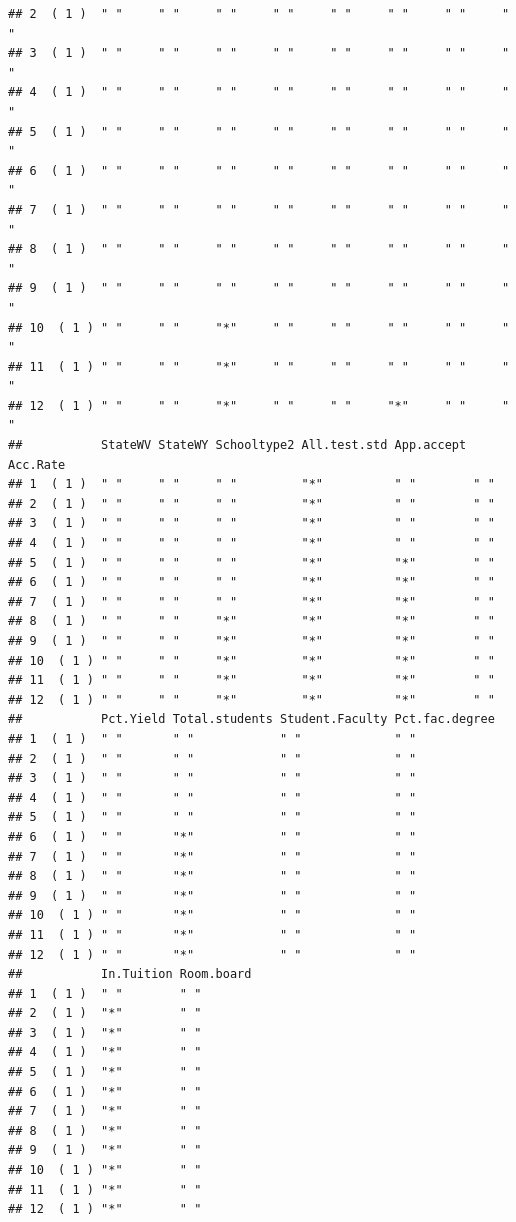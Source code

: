 \documentclass[]{article}
\begin{document}
\begin{verbatim}
## 2  ( 1 )  " "     " "     " "     " "     " "     " "     " "     " "    
## 3  ( 1 )  " "     " "     " "     " "     " "     " "     " "     " "    
## 4  ( 1 )  " "     " "     " "     " "     " "     " "     " "     " "    
## 5  ( 1 )  " "     " "     " "     " "     " "     " "     " "     " "    
## 6  ( 1 )  " "     " "     " "     " "     " "     " "     " "     " "    
## 7  ( 1 )  " "     " "     " "     " "     " "     " "     " "     " "    
## 8  ( 1 )  " "     " "     " "     " "     " "     " "     " "     " "    
## 9  ( 1 )  " "     " "     " "     " "     " "     " "     " "     " "    
## 10  ( 1 ) " "     " "     "*"     " "     " "     " "     " "     " "    
## 11  ( 1 ) " "     " "     "*"     " "     " "     " "     " "     " "    
## 12  ( 1 ) " "     " "     "*"     " "     " "     "*"     " "     " "    
##           StateWV StateWY Schooltype2 All.test.std App.accept Acc.Rate
## 1  ( 1 )  " "     " "     " "         "*"          " "        " "     
## 2  ( 1 )  " "     " "     " "         "*"          " "        " "     
## 3  ( 1 )  " "     " "     " "         "*"          " "        " "     
## 4  ( 1 )  " "     " "     " "         "*"          " "        " "     
## 5  ( 1 )  " "     " "     " "         "*"          "*"        " "     
## 6  ( 1 )  " "     " "     " "         "*"          "*"        " "     
## 7  ( 1 )  " "     " "     " "         "*"          "*"        " "     
## 8  ( 1 )  " "     " "     "*"         "*"          "*"        " "     
## 9  ( 1 )  " "     " "     "*"         "*"          "*"        " "     
## 10  ( 1 ) " "     " "     "*"         "*"          "*"        " "     
## 11  ( 1 ) " "     " "     "*"         "*"          "*"        " "     
## 12  ( 1 ) " "     " "     "*"         "*"          "*"        " "     
##           Pct.Yield Total.students Student.Faculty Pct.fac.degree
## 1  ( 1 )  " "       " "            " "             " "           
## 2  ( 1 )  " "       " "            " "             " "           
## 3  ( 1 )  " "       " "            " "             " "           
## 4  ( 1 )  " "       " "            " "             " "           
## 5  ( 1 )  " "       " "            " "             " "           
## 6  ( 1 )  " "       "*"            " "             " "           
## 7  ( 1 )  " "       "*"            " "             " "           
## 8  ( 1 )  " "       "*"            " "             " "           
## 9  ( 1 )  " "       "*"            " "             " "           
## 10  ( 1 ) " "       "*"            " "             " "           
## 11  ( 1 ) " "       "*"            " "             " "           
## 12  ( 1 ) " "       "*"            " "             " "           
##           In.Tuition Room.board
## 1  ( 1 )  " "        " "       
## 2  ( 1 )  "*"        " "       
## 3  ( 1 )  "*"        " "       
## 4  ( 1 )  "*"        " "       
## 5  ( 1 )  "*"        " "       
## 6  ( 1 )  "*"        " "       
## 7  ( 1 )  "*"        " "       
## 8  ( 1 )  "*"        " "       
## 9  ( 1 )  "*"        " "       
## 10  ( 1 ) "*"        " "       
## 11  ( 1 ) "*"        " "       
## 12  ( 1 ) "*"        " "
\end{verbatim}
\end{document}
